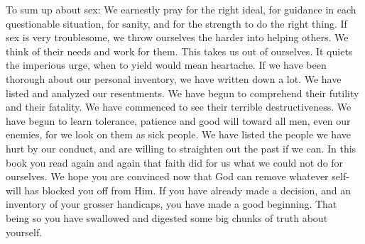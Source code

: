 \begin{biblechapter}
To sum up about sex:  We earnestly pray for the right ideal, for guidance in each questionable situation, for sanity, and for the strength to do the right thing.  If sex is very troublesome, we throw ourselves the harder into helping others.  We think of their needs and work for them.  This takes us out of ourselves.  It quiets the imperious urge, when to yield would mean heartache.
If we have been thorough about our personal inventory, we have written down a lot.  We have listed and analyzed our resentments.  We have begun to comprehend their futility and their fatality.  We have commenced to see their terrible destructiveness.  We have begun to learn tolerance, patience and good will toward all men, even our enemies, for we look on them as sick people.  We have listed the people we have hurt by our conduct, and are willing to straighten out the past if we can.
In this book you read again and again that faith did for us what we could not do for ourselves.  We hope you are convinced now that God can remove whatever self-will has blocked you off from Him.  If you have already made a decision, and an inventory of your grosser handicaps, you have made a good beginning.  That being so you have swallowed and digested some big chunks of truth about yourself.

\end{biblechapter}

